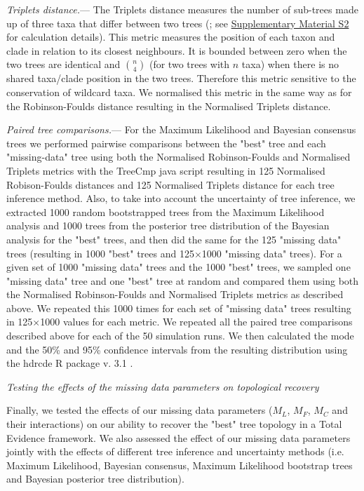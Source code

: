 \documentclass[12pt,letterpaper]{article}
\renewcommand{\subsection}[1]{%
\bigskip
\begin{center}
\begin{large}
\normalfont\itshape #1
\end{large}
\end{center}}
\renewcommand{\subsubsection}[1]{%
\vspace{2ex}
\noindent
\textit{#1.}---}
\begin{document}
\subsubsection{Triplets distance}
The Triplets distance \citep{dobson1975triplets} measures the number of sub-trees made up of three taxa that differ between two trees (\citealt{critchlowthe1996}; see \hyperref[SupplementaryMaterial]{Supplementary Material S2} for calculation details). This metric measures the position of each taxon and clade in relation to its closest neighbours. It is bounded between zero when the two trees are identical and $\binom{n}{4}$ (for two trees with $n$ taxa) when there is no shared taxa/clade position in the two trees. Therefore this metric sensitive to the conservation of wildcard taxa. We normalised this metric in the same way as for the Robinson-Foulds distance resulting in the Normalised Triplets distance.

\subsubsection{Paired tree comparisons}
\label{tree_comparisons}
For the Maximum Likelihood and Bayesian consensus trees we performed pairwise comparisons between the "best" tree and each "missing-data" tree using both the Normalised Robinson-Foulds and Normalised Triplets metrics with the TreeCmp java script \citep{Bogdanowicz2012} resulting in 125 Normalised Robison-Foulds distances and 125 Normalised Triplets distance for each tree inference method. Also, to take into account the uncertainty of tree inference, we extracted 1000 random bootstrapped trees from the Maximum Likelihood analysis and 1000 trees from the posterior tree distribution of the Bayesian analysis for the "best" trees, and then did the same for the 125 "missing data" trees (resulting in 1000 "best" trees and 125$\times$1000 "missing data" trees). 
For a given set of 1000 "missing data" trees and the 1000 "best" trees, we sampled one "missing data" tree and one "best" tree at random and compared them using both the Normalised Robinson-Foulds and Normalised Triplets metrics as described above. We repeated this 1000 times for each set of "missing data" trees resulting in 125$\times$1000 values for each metric. We repeated all the paired tree comparisons described above for each of the 50 simulation runs. We then calculated the mode and the 50\% and 95\% confidence intervals from the resulting distribution using the hdrcde R package v. 3.1 \citep{hdrcde}.

\subsection{Testing the effects of the missing data parameters on topological recovery}
Finally, we tested the effects of our missing data parameters ($M_{L}$, $M_{F}$, $M_{C}$ and their interactions) on our ability to recover the "best" tree topology in a Total Evidence framework. We also assessed the effect of our missing data parameters jointly with the effects of different tree inference and uncertainty methods (i.e. Maximum Likelihood, Bayesian consensus, Maximum Likelihood bootstrap trees and Bayesian posterior tree distribution).
\end{document}
